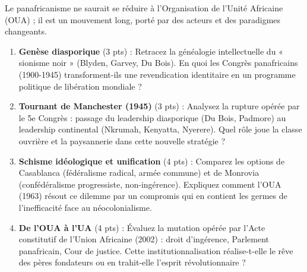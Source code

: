 \documentclass[11pt]{article}
\begin{document}
\begin{exercice}
Le panafricanisme ne saurait se réduire à l'Organisation de l'Unité Africaine (OUA) ; il est un mouvement long, porté par des acteurs et des paradigmes changeants.
\begin{enumerate}
    \item \textbf{Genèse diasporique} (3 pts) : Retracez la généalogie intellectuelle du « sionisme noir » (Blyden, Garvey, Du Bois). En quoi les Congrès panafricains (1900-1945) transforment-ils une revendication identitaire en un programme politique de libération mondiale ?
    \item \textbf{Tournant de Manchester (1945)} (3 pts) : Analysez la rupture opérée par le 5e Congrès : passage du leadership diasporique (Du Bois, Padmore) au leadership continental (Nkrumah, Kenyatta, Nyerere). Quel rôle joue la classe ouvrière et la paysannerie dans cette nouvelle stratégie ?
    \item \textbf{Schisme idéologique et unification} (4 pts) : Comparez les options de Casablanca (fédéralisme radical, armée commune) et de Monrovia (confédéralisme progressiste, non-ingérence). Expliquez comment l'OUA (1963) résout ce dilemme par un compromis qui en contient les germes de l'inefficacité face au néocolonialisme.
    \item \textbf{De l'OUA à l'UA} (4 pts) : Évaluez la mutation opérée par l'Acte constitutif de l'Union Africaine (2002) : droit d'ingérence, Parlement panafricain, Cour de justice. Cette institutionnalisation réalise-t-elle le rêve des pères fondateurs ou en trahit-elle l'esprit révolutionnaire ?
\end{enumerate}
\end{exercice}
\end{document}
